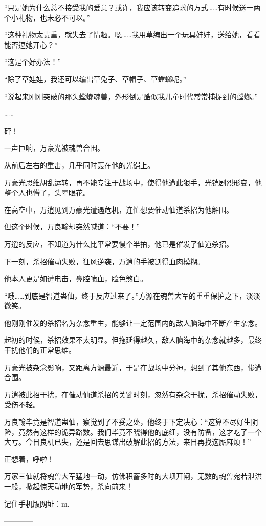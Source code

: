 \begin{this_body}
“只是她为什么总不接受我的爱意？或许，我应该转变追求的方式……有时候送一两个小礼物，也未必不可以。”

“这种礼物太贵重，就失去了情趣。嗯……我用草编出一个玩具娃娃，送给她，看看能否逗她开心？”

“这是个好办法！”

“除了草娃娃，我还可以编出草兔子、草帽子、草螳螂呢。”

“说起来刚刚突破的那头螳螂魂兽，外形倒是酷似我儿童时代常常捕捉到的螳螂。”

……

砰！

一声巨响，万豪光被魂兽合围。

从前后左右的重击，几乎同时轰在他的光铠上。

万豪光思维胡乱运转，再不能专注于战场中，使得他遭此狠手，光铠剧烈形变，他整个人也懵了，头晕眼花。

在高空中，万逍见到万豪光遭遇危机，连忙想要催动仙道杀招为他解围。

但这个时候，万良翰却突然喊道：“不要！”

万逍的反应，不知道为什么比平常要慢个半拍，他已是催发了仙道杀招。

下一刻，杀招催动失败，狂风逆袭，万逍的手被割得血肉模糊。

他本人更是如遭电击，鼻腔喷血，脸色煞白。

“哦……到底是智道蛊仙，终于反应过来了。”方源在魂兽大军的重重保护之下，淡淡微笑。

他刚刚催发的杀招名为杂念重生，能够让一定范围内的敌人脑海中不断产生杂念。

起初的时候，杀招效果不太明显。但拖延得越久，敌人脑海中的杂念就越多，最终干扰他们的正常思维。

万豪光被杂念影响，又距离方源最近，于是在战场中分神，想到了其他东西，惨遭合围。

万逍被此招干扰，在催动仙道杀招的关键时刻，忽然有杂念干扰，杀招催动失败，受伤不轻。

万良翰毕竟是智道蛊仙，察觉到了不妥之处，他终于下定决心：“这算不尽好生阴险，竟然有这样的诡异路数。我们毕竟不晓得他的底细，没有防备，这才吃了一个大亏。今日良机已失，还是回去思谋出破解此招的方法，来日再找这厮麻烦！”

正想着，呼啦！

万家三仙就将魂兽大军猛地一动，仿佛积蓄多时的大坝开闸，无数的魂兽宛若泄洪一般，掀起惊天动地的军势，杀向前来！

记住手机版网址：m.

------------

\end{this_body}

